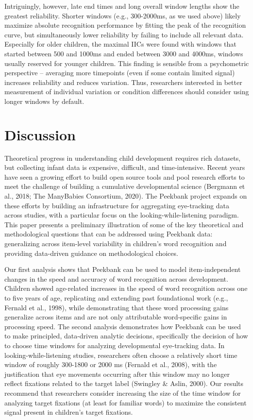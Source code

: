 \documentclass[10pt, letterpaper]{article}
\begin{document}
Intriguingly, however, late end times and long overall window lengths
show the greatest reliability. Shorter windows (e.g., 300-2000ms, as we
used above) likely maximize absolute recognition performance by fitting
the peak of the recognition curve, but simultaneously lower reliability
by failing to include all relevant data. Especially for older children,
the maximal IICs were found with windows that started between 500 and
1000ms and ended between 3000 and 4000ms, windows usually reserved for
younger children. This finding is sensible from a psychometric
perspective -- averaging more timepoints (even if some contain limited
signal) increases reliability and reduces variation. Thus, researchers
interested in better measurement of individual variation or condition
differences should consider using longer windows by default.

\hypertarget{discussion}{%
\section{Discussion}\label{discussion}}

Theoretical progress in understanding child development requires rich
datasets, but collecting infant data is expensive, difficult, and
time-intensive. Recent years have seen a growing effort to build open
source tools and pool research efforts to meet the challenge of building
a cumulative developmental science (Bergmann et al., 2018; The
ManyBabies Consortium, 2020). The Peekbank project expands on these
efforts by building an infrastructure for aggregating eye-tracking data
across studies, with a particular focus on the looking-while-listening
paradigm. This paper presents a preliminary illustration of some of the
key theoretical and methodological questions that can be addressed using
Peekbank data: generalizing across item-level variability in children's
word recognition and providing data-driven guidance on methodological
choices.

Our first analysis shows that Peekbank can be used to model
item-independent changes in the speed and accuracy of word recognition
across development. Children showed age-related increases in the speed
of word recognition across one to five years of age, replicating and
extending past foundational work (e.g., Fernald et al., 1998), while
demonstrating that these word processing gains generalize across items
and are not only attributable word-specific gains in processing speed.
The second analysis demonstrates how Peekbank can be used to make
principled, data-driven analytic decisions, specifically the decision of
how to choose time windows for analyzing developmental eye-tracking
data. In looking-while-listening studies, researchers often choose a
relatively short time window of roughly 300-1800 or 2000 ms (Fernald et
al., 2008), with the justification that eye movements occurring after
this window may no longer reflect fixations related to the target label
(Swingley \& Aslin, 2000). Our results recommend that researchers
consider increasing the size of the time window for analyzing target
fixations (at least for familiar words) to maximize the consistent
signal present in children's target fixations.
\end{document}
